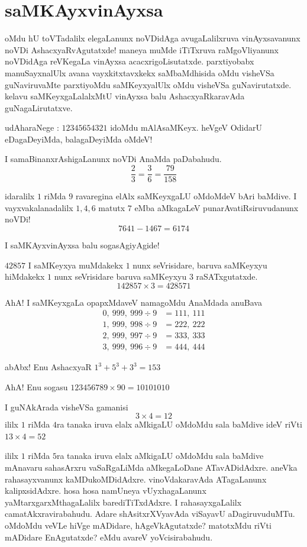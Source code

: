 \chapter{saMKAyxvinAyxsa}

oMdu hU toVTadalilx elegaLanunx noVDidAga avugaLalilxruva vinAyxsavanunx noVDi AshacxyaRvAgutatxde! maneya muMde iTiTxruva raMgoVliyanunx noVDidAga reVKegaLa vinAyxsa acacxrigoLisutatxde. parxtiyobabx manuSayxnalUlx avana vayxkitxtavxkekx saMbaMdhisida oMdu visheVSa guNaviruvaMte parxtiyoMdu saMKeyxyalUlx oMdu visheVSa guNavirutatxde. kelavu saMKeyxgaLalalxMtU vinAyxsa balu AshacxyaRkaravAda guNagaLirutatxve. 

udAharaNege : $12345654321$ idoMdu mAlAsaMKeyx. heVgeV OdidarU eDagaDeyiMda, balagaDeyiMda oMdeV!

I samaBinanxrAshigaLanunx noVDi AnaMda paDabahudu.
$$
\frac{2}{3} = \frac{3}{6} = \frac{79}{158}
$$

idaralilx $1$ riMda $9$ ravaregina elAlx saMKeyxgaLU oMdoMdeV bAri baMdive. I vayxvakalanadalilx $1, 4, 6$ matutx $7$ eMba aMkagaLeV punarAvatiRsiruvudanunx noVDi!
$$
7641-1467 = 6174
$$

I saMKAyxvinAyxsa balu sogasAgiyAgide!

\eject

$42857$ I saMKeyxya muMdakekx $1$ nunx seVrisidare, baruva saMKeyxyu hiMdakekx $1$ nunx seVrisidare baruva saMKeyxyu $3$ raSATxgutatxde.
$$
142857 \times 3 = 428571
$$

AhA! I saMKeyxgaLa opapxMdaveV namagoMdu AnaMdada anuBava
\begin{align*}
0, ~ 999, ~999 \div 9 & =111, ~111\\
1, ~999,~998 \div 9& =222, ~222\\
2,~999,~997 \div 9 &=333, ~ 333\\
3,~999, ~996 \div 9&=444, ~444
\end{align*}

abAbx! Enu AshacxyaR $1^3 + 5^3 + 3^3 = 153$

AhA! Enu sogasu $123456789 \times 90=10101010$

I guNAkArada visheVSa gamanisi
$$
3 \times 4 = 12
$$
ililx $1$ riMda $4$ra tanaka iruva elalx aMkigaLU oMdoMdu sala baMdive ideV riVti $13 \times 4 = 52$

ililx $1$ riMda $5$ra tanaka iruva elalx aMkigaLU oMdoMdu sala baMdive mAnavaru sahasArxru vaSaRgaLiMda aMkegaLoDane ATavADidAdxre. aneVka rahasayxvanunx kaMDukoMDidAdxre. vinoVdakaravAda ATagaLanunx kalipxsidAdxre. hosa hosa namUneya vUyxhagaLanunx yaMtarxgarxMthagaLalilx barediTiTxdAdxre. I rahasayxgaLalilx camatAkxravirabahudu.  Adare shAsitxrXVyavAda viSayavU aDagiruvuduMTu. oMdoMdu veVLe hiVge mADidare, hAgeVkAgutatxde? matotxMdu riVti mADidare EnAgutatxde? eMdu avareV yoVcisirabahudu.

